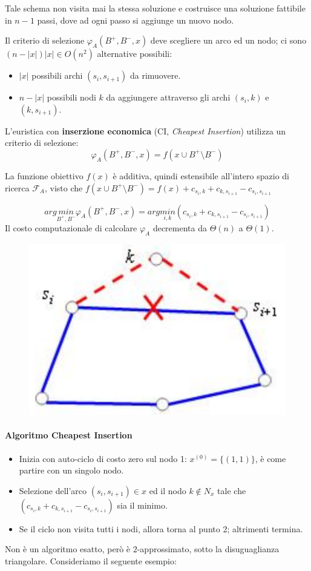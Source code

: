 \documentclass{article}
\begin{document}
Tale schema non visita mai la stessa soluzione e costruisce una soluzione fattibile in $n-1$ passi,
dove ad ogni passo si aggiunge un nuovo nodo.

Il criterio di selezione $\varphi_A(B^+,B^-,x)$ deve scegliere un arco ed un nodo;
ci sono $(n-|x|)|x|\in O(n^2)$ alternative possibili:
\begin{itemize}
    \item $|x|$ possibili archi $(s_i,s_{i+1})$ da rimuovere.
    \item $n-|x|$ possibili nodi $k$ da aggiungere attraverso gli archi $(s_i,k)$ e $(k,s_{i+1})$.
\end{itemize}
L'euristica con \textbf{inserzione economica} (CI, \textit{Cheapest Insertion}) utilizza un criterio di selezione:
$$\varphi_A(B^+,B^-,x)=f(x\cup B^+\setminus B^-)$$

La funzione obiettivo $f(x)$ è additiva, quindi estensibile all'intero spazio di ricerca $\mathcal{F}_A$,
visto che $f(x\cup B^+\setminus B^-)=f(x)+c_{s_i,k}+c_{k,s_{i+1}}-c_{s_i,s_{i+1}}$

$$arg\underset{B^+,B^-}{min}\varphi_A(B^+,B^-,x)=arg \underset{i,k}{ min}(c_{s_i,k}+c_{k,s_{i+1}}-c_{s_i,s_{i+1}})$$
Il costo computazionale di calcolare $\varphi_A$ decrementa da $\Theta(n)$ a $\Theta(1)$.
\begin{figure}[H]
    \centering
    \includegraphics[scale=0.5]{images/thtsf.png}
\end{figure}
\paragraph{Algoritmo Cheapest Insertion}
\begin{itemize}
    \item Inizia con auto-ciclo di costo zero sul nodo 1: $x^{(0)}=\{(1,1)\}$,
          è come partire con un singolo nodo.
    \item Selezione dell'arco $(s_i,s_{i+1})\in x$ ed il nodo $k\notin N_x$ tale che
          $(c_{s_i,k}+c_{k,s_{i+1}}-c_{s_i,s_{i+1}})$ sia il minimo.
    \item Se il ciclo non visita tutti i nodi, allora torna al punto 2; altrimenti termina.
\end{itemize}
Non è un algoritmo esatto, però è $2$-approssimato, sotto la disuguaglianza triangolare. Consideriamo
il seguente esempio:
\end{document}
